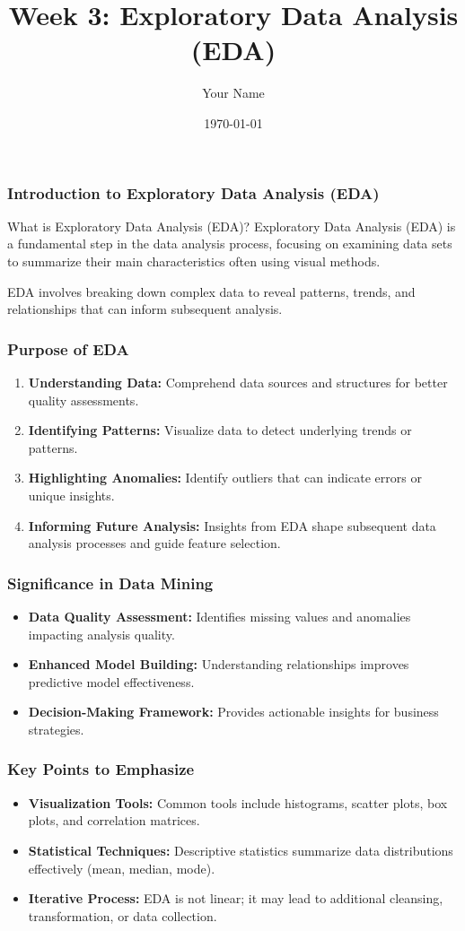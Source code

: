 \documentclass{beamer}
\title{Week 3: Exploratory Data Analysis (EDA)}
\author{Your Name}
\institute{Your Institution}
\date{\today}
\begin{document}
\frame{\titlepage}

\begin{frame}[fragile]
    \frametitle{Introduction to Exploratory Data Analysis (EDA)}
    \begin{block}{What is Exploratory Data Analysis (EDA)?}
        Exploratory Data Analysis (EDA) is a fundamental step in the data analysis process, focusing on examining data sets to summarize their main characteristics often using visual methods.
    \end{block}
    EDA involves breaking down complex data to reveal patterns, trends, and relationships that can inform subsequent analysis.
\end{frame}

\begin{frame}[fragile]
    \frametitle{Purpose of EDA}
    \begin{enumerate}
        \item \textbf{Understanding Data:} Comprehend data sources and structures for better quality assessments.
        \item \textbf{Identifying Patterns:} Visualize data to detect underlying trends or patterns.
        \item \textbf{Highlighting Anomalies:} Identify outliers that can indicate errors or unique insights.
        \item \textbf{Informing Future Analysis:} Insights from EDA shape subsequent data analysis processes and guide feature selection.
    \end{enumerate}
\end{frame}

\begin{frame}[fragile]
    \frametitle{Significance in Data Mining}
    \begin{itemize}
        \item \textbf{Data Quality Assessment:} Identifies missing values and anomalies impacting analysis quality.
        \item \textbf{Enhanced Model Building:} Understanding relationships improves predictive model effectiveness.
        \item \textbf{Decision-Making Framework:} Provides actionable insights for business strategies.
    \end{itemize}
\end{frame}

\begin{frame}[fragile]
    \frametitle{Key Points to Emphasize}
    \begin{itemize}
        \item \textbf{Visualization Tools:} Common tools include histograms, scatter plots, box plots, and correlation matrices.
        \item \textbf{Statistical Techniques:} Descriptive statistics summarize data distributions effectively (mean, median, mode).
        \item \textbf{Iterative Process:} EDA is not linear; it may lead to additional cleansing, transformation, or data collection.
    \end{itemize}
\end{frame}
\end{document}
